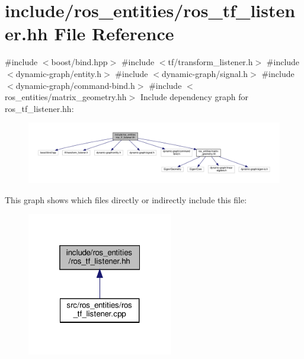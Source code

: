 \hypertarget{ros__tf__listener_8hh}{}\section{include/ros\+\_\+entities/ros\+\_\+tf\+\_\+listener.hh File Reference}
\label{ros__tf__listener_8hh}
{\ttfamily \#include $<$boost/bind.\+hpp$>$}\newline
{\ttfamily \#include $<$tf/transform\+\_\+listener.\+h$>$}\newline
{\ttfamily \#include $<$dynamic-\/graph/entity.\+h$>$}\newline
{\ttfamily \#include $<$dynamic-\/graph/signal.\+h$>$}\newline
{\ttfamily \#include $<$dynamic-\/graph/command-\/bind.\+h$>$}\newline
{\ttfamily \#include $<$ros\+\_\+entities/matrix\+\_\+geometry.\+hh$>$}\newline
Include dependency graph for ros\+\_\+tf\+\_\+listener.\+hh\+:
\nopagebreak
\begin{figure}[H]
\begin{center}
\leavevmode
\includegraphics[width=350pt]{ros__tf__listener_8hh__incl}
\end{center}
\end{figure}
This graph shows which files directly or indirectly include this file\+:
\nopagebreak
\begin{figure}[H]
\begin{center}
\leavevmode
\includegraphics[width=181pt]{ros__tf__listener_8hh__dep__incl}
\end{center}
\end{figure}
